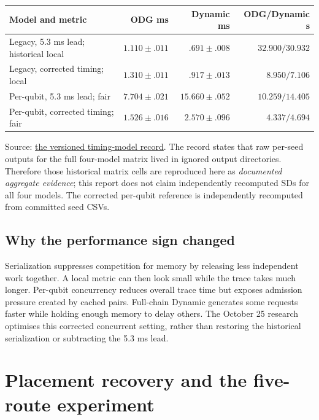 \documentclass[11pt,a4paper,oneside]{report}
\newcommand{\repo}{https://github.com/sanjeevkrishnaa/Compiler-Driven-ACE}
\newcommand{\snap}{4aa334542e9b9c8fe7a5f9cc8fe48ee2e4d2fa55}
\newcommand{\src}[2]{\href{\repo/blob/\snap/#1}{#2}}
\begin{document}
\begin{center}\small
\begin{tabular}{p{.31\linewidth}rrr}
\toprule Model and metric & ODG ms & Dynamic ms & ODG/Dynamic s\\\midrule
Legacy, 5.3 ms lead; historical local & $1.110\pm.011$ & $.691\pm.008$ & $32.900/30.932$\\
Legacy, corrected timing; local & $1.310\pm.011$ & $.917\pm.013$ & $8.950/7.106$\\
Per-qubit, 5.3 ms lead; fair & $7.704\pm.021$ & $15.660\pm.052$ & $10.259/14.405$\\
Per-qubit, corrected timing; fair & $1.526\pm.016$ & $2.570\pm.096$ & $4.337/4.694$\\
\bottomrule
\end{tabular}
\end{center}
Source: \src{docs/reports/qft96-timing-model-matrix-2026-10-25.md}{the versioned timing-model record}. The record states that raw per-seed outputs for the full four-model matrix lived in ignored output directories. Therefore those historical matrix cells are reproduced here as \emph{documented aggregate evidence}; this report does not claim independently recomputed SDs for all four models. The corrected per-qubit reference is independently recomputed from committed seed CSVs.

\section{Why the performance sign changed}
Serialization suppresses competition for memory by releasing less independent work together. A local metric can then look small while the trace takes much longer. Per-qubit concurrency reduces overall trace time but exposes admission pressure created by cached pairs. Full-chain Dynamic generates some requests faster while holding enough memory to delay others. The October 25 research optimises this corrected concurrent setting, rather than restoring the historical serialization or subtracting the 5.3 ms lead.

\chapter{Placement recovery and the five-route experiment}
\end{document}
